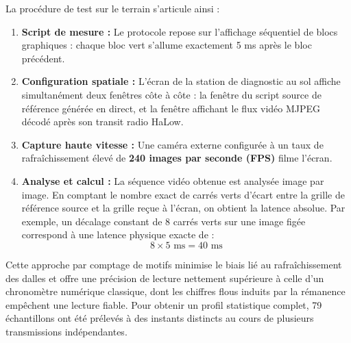 La procédure de test sur le terrain s'articule ainsi :
\begin{enumerate}
    \item \textbf{Script de mesure :} Le protocole repose sur l'affichage séquentiel de blocs graphiques : chaque bloc vert s'allume exactement 5 ms 
    après le bloc précédent.
    \item \textbf{Configuration spatiale :} L'écran de la station de diagnostic au sol 
    affiche simultanément deux fenêtres côte à côte : 
    la fenêtre du script source de référence générée en direct, et la fenêtre affichant le flux vidéo MJPEG 
    décodé après son transit radio HaLow.
    \item \textbf{Capture haute vitesse :} Une caméra externe configurée à un taux de rafraîchissement élevé 
    de \textbf{240 images par seconde (FPS)} filme l'écran.
    \item \textbf{Analyse et calcul :} La séquence vidéo obtenue est analysée image par image. En comptant le 
    nombre exact de carrés verts d'écart entre la grille de référence source et la grille reçue à l'écran, 
    on obtient la latence absolue. Par exemple, un décalage constant de 8 carrés verts sur une image 
    figée correspond à une latence physique exacte de :
    $$8 \times 5 \text{ ms} = 40 \text{ ms}$$
\end{enumerate}

Cette approche par comptage de motifs minimise le biais lié au rafraîchissement des dalles 
et offre une précision de lecture nettement supérieure à celle d'un chronomètre numérique classique, dont les 
chiffres flous induits par la rémanence empêchent une lecture fiable. Pour obtenir un profil statistique 
complet, 79 échantillons ont été prélevés à des instants distincts au cours de plusieurs transmissions indépendantes.

\newpage

